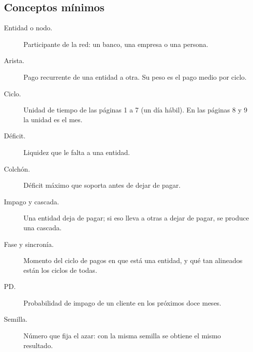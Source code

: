 \subsection{Conceptos mínimos}
\label{sec:conceptos}
\begin{description}
\item[Entidad o nodo.] Participante de la red: un banco, una empresa o una persona.
\item[Arista.] Pago recurrente de una entidad a otra. Su peso es el pago medio por ciclo.
\item[Ciclo.] Unidad de tiempo de las páginas 1 a 7 (un día hábil). En las páginas 8 y 9
la unidad es el mes.
\item[Déficit.] Liquidez que le falta a una entidad.
\item[Colchón.] Déficit máximo que soporta antes de dejar de pagar.
\item[Impago y cascada.] Una entidad deja de pagar; si eso lleva a otras a dejar de pagar,
se produce una cascada.
\item[Fase y sincronía.] Momento del ciclo de pagos en que está una entidad, y qué tan
alineados están los ciclos de todas.
\item[PD.] Probabilidad de impago de un cliente en los próximos doce meses.
\item[Semilla.] Número que fija el azar: con la misma semilla se obtiene el mismo
resultado.
\end{description}
